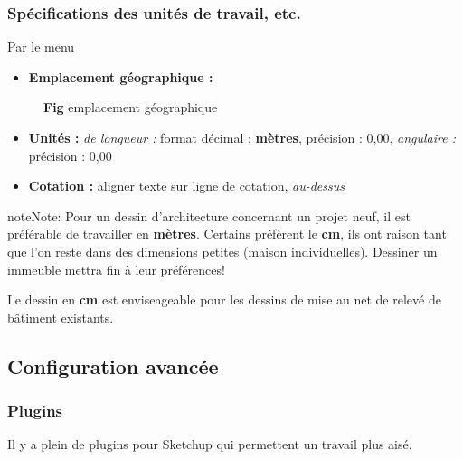 \documentclass[a4paper,12pt,french]{sphinxmanual}
\begin{document}
\subsubsection{Spécifications des unités de travail, etc.}
\label{su/config-su:specifications-des-unites-de-travail-etc}
Par le menu 
\begin{itemize}
\item {} 
\textbf{Emplacement géographique :}

\end{itemize}
\begin{figure}[htbp]
\centering
\capstart

\noindent{}
\caption{\textbf{Fig} emplacement géographique}\label{su/config-su:id4}\end{figure}
\begin{itemize}
\item {} 
\textbf{Unités :} \emph{de longueur :} format décimal : \textbf{mètres}, précision : 0,00,  \emph{angulaire :} précision : 0,00

\item {} 
\textbf{Cotation :} aligner texte sur ligne de cotation, \emph{au-dessus}

\end{itemize}

\begin{notice}{note}{Note:}
Pour un dessin d'architecture concernant un projet neuf, il est préférable de travailler en \textbf{mètres}.
Certains préfèrent le \textbf{cm}, ils ont raison tant que l'on reste dans des dimensions petites (maison individuelles). Dessiner un immeuble mettra fin à leur préférences!

Le dessin en \textbf{cm} est enviseageable pour les dessins de mise au net de relevé de bâtiment existants.
\end{notice}


\subsection{Configuration avancée}
\label{su/config-su:configuration-avancee}\label{su/config-su:config-su-02}

\subsubsection{Plugins}
\label{su/config-su:plugins}
Il y a plein de plugins pour Sketchup qui permettent un travail plus aisé.
\end{document}
